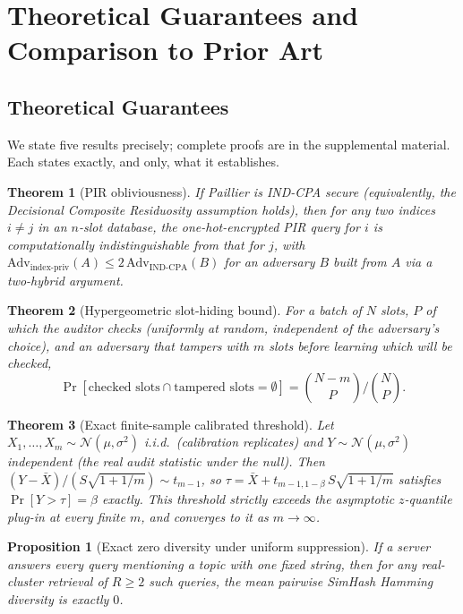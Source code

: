 \documentclass[10pt,journal,compsoc]{IEEEtran}
\newtheorem{theorem}{Theorem}
\newtheorem{proposition}{Proposition}
\begin{document}
\section{Theoretical Guarantees and Comparison to Prior Art}
\label{sec:theory-and-comparison}

\subsection{Theoretical Guarantees}
\label{sec:theory}

We state five results precisely; complete proofs are in the supplemental material. Each states exactly, and only, what it establishes.

\begin{theorem}[PIR obliviousness]
\label{thm:pir}
If Paillier is IND-CPA secure (equivalently, the Decisional Composite Residuosity assumption holds), then for any two indices $i \neq j$ in an $n$-slot database, the one-hot-encrypted PIR query for $i$ is computationally indistinguishable from that for $j$, with $\text{Adv}_{\text{index-priv}}(A) \le 2\,\text{Adv}_{\text{IND-CPA}}(B)$ for an adversary $B$ built from $A$ via a two-hybrid argument.
\end{theorem}

\begin{theorem}[Hypergeometric slot-hiding bound]
\label{thm:hypergeom}
For a batch of $N$ slots, $P$ of which the auditor checks (uniformly at random, independent of the adversary's choice), and an adversary that tampers with $m$ slots before learning which will be checked,
$$\Pr[\text{checked slots} \cap \text{tampered slots} = \emptyset] = \binom{N-m}{P}\Big/\binom{N}{P}.$$
\end{theorem}

\begin{theorem}[Exact finite-sample calibrated threshold]
\label{thm:predquantile}
Let $X_1,\ldots,X_m \sim \mathcal{N}(\mu,\sigma^2)$ i.i.d.\ (calibration replicates) and $Y \sim \mathcal{N}(\mu,\sigma^2)$ independent (the real audit statistic under the null). Then $(Y-\bar X)/(S\sqrt{1+1/m}) \sim t_{m-1}$, so $\tau = \bar X + t_{m-1,1-\beta}\, S\sqrt{1+1/m}$ satisfies $\Pr[Y>\tau]=\beta$ exactly. This threshold strictly exceeds the asymptotic $z$-quantile plug-in at every finite $m$, and converges to it as $m\to\infty$.
\end{theorem}

\begin{proposition}[Exact zero diversity under uniform suppression]
\label{prop:zerodiv}
If a server answers every query mentioning a topic with one fixed string, then for any real-cluster retrieval of $R\ge2$ such queries, the mean pairwise SimHash Hamming diversity is exactly $0$.
\end{proposition}
\end{document}

